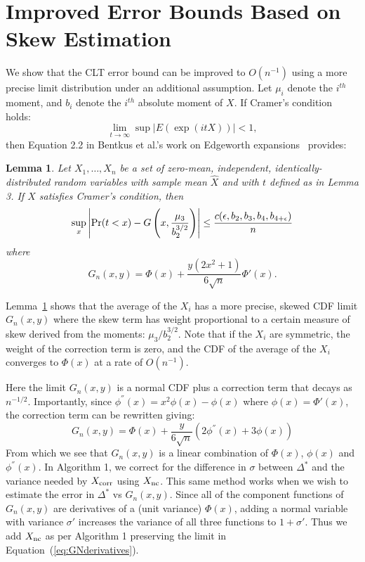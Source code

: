 \documentclass{article}
\newtheorem{lemma}{Lemma}
\begin{document}
\section{Improved Error Bounds Based on Skew Estimation}\label{app:better_error_bound}

We show that the CLT error bound can be improved to $O(n^{-1})$ 
using a more precise limit distribution under an additional assumption. Let
$\mu_i$ denote the $i^{th}$ moment, and $b_i$ denote the $i^{th}$ absolute
moment of $X$. If Cramer's condition holds:
\begin{equation}\label{eq:cramers_condition}
    \lim_{t \to \infty} \sup |E(\exp(i t X))| < 1,
\end{equation}
then Equation 2.2 in Bentkus et al.'s work on Edgeworth
expansions~\cite{Bentkus97} provides:

\begin{lemma}\label{lem:clt_edgeworth}
Let $X_1,\ldots,X_n$ be a set of zero-mean, independent, identically-distributed
random variables with sample mean $\hat{X}$ and with $t$ defined as in Lemma 3.
If $X$ satisfies Cramer's condition, then
\[
    \sup_x\left|{\rm Pr}(t<x) - G\left(x, \frac{\mu_3}{b_2^{3/2}}\right)\right| \leq \frac{c(\epsilon,b_2,b_3,b_4,b_{4+\epsilon})}{n}
\]
where
\begin{equation}
    G_n(x,y) = \Phi(x) + \frac{y(2x^2+1)}{6\sqrt{n}}\Phi'(x).
\end{equation}
\end{lemma}
Lemma~\ref{lem:clt_edgeworth} shows that the average of the $X_i$ has a more
precise, skewed CDF limit $G_n(x,y)$ where the skew term has weight proportional
to a certain measure of skew derived from the moments:
$\mu_3/b_2^{3/2}$. Note that if the $X_i$ are symmetric, the weight of
the correction term is zero, and the CDF of the average of the $X_i$ converges
to $\Phi(x)$ at a rate of $O(n^{-1})$.

Here the limit $G_n(x,y)$ is a normal CDF plus a correction term that decays as
$n^{-1/2}$.
Importantly, since $\phi^{''}(x) = x^2\phi(x) - \phi(x)$ where
$\phi(x)=\Phi'(x)$, the correction term can be rewritten giving:
\begin{equation}\label{eq:GNderivatives}
    G_n(x,y) = \Phi(x) + \frac{y}{6\sqrt{n}}(2\phi^{''}(x)+3\phi(x))
\end{equation}
From which we see that $G_n(x,y)$ is a linear combination of $\Phi(x)$,
$\phi(x)$ and $\phi^{''}(x)$. In Algorithm 1, we
correct for the difference in $\sigma$ between $\Delta^*$ and the variance
needed by $X_{\rm corr}$ using $X_{\rm nc}$. This same method works when we
wish to estimate the error in $\Delta^*$ vs $G_n(x,y)$. Since all of the
component functions of $G_n(x,y)$ are derivatives of a (unit variance)
$\Phi(x)$, adding a normal variable with variance $\sigma'$ increases the
variance of all three functions to $1+\sigma'$. Thus we add $X_{\rm nc}$ as
per Algorithm 1 preserving the limit in Equation~(\ref{eq:GNderivatives}).
\end{document}
